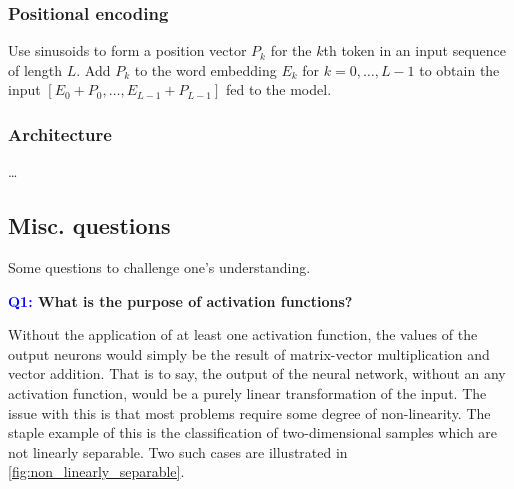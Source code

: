 \documentclass[11pt]{article}
\begin{document}
\subsubsection{Positional encoding}
Use sinusoids to form a position vector $P_k$ for the $k$th token in an input sequence of length $L$. Add $P_k$ to the word embedding $E_k$ for $k=0,\dots,L-1$ to obtain the input $[E_0+P_0,\dots,E_{L-1}+P_{L-1}]$ fed to the model.

\subsubsection{Architecture}
\dots

\subsection{Misc. questions}

Some questions to challenge one's understanding.

\begin{center}
    \textbf{\textcolor{blue}{Q1:} What is the purpose of activation functions?}
\end{center}
Without the application of at least one activation function, the values of the output neurons would simply be the result of matrix-vector multiplication and vector addition. That is to say, the output of the neural network, without an any activation function, would be a purely linear transformation of the input. The issue with this is that most problems require some degree of non-linearity. The staple example of this is the classification of two-dimensional samples which are not linearly separable. Two such cases are illustrated in \autoref{fig:non_linearly_separable}.
\end{document}
